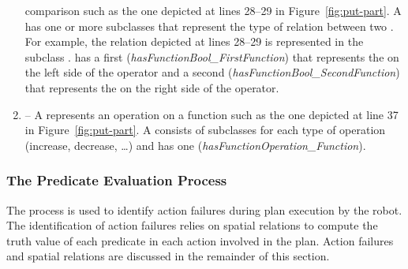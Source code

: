\begin{enumerate}
comparison such as the one depicted at lines 28--29 in Figure~\ref{fig:put-part}.
A  has one or more subclasses that represent the type of relation
between two . For example, the relation depicted at lines 28--29 is
represented in the subclass .  has a first
 (\emph{hasFunctionBool\_FirstFunction}) that represents the 
on the left side of the operator and a second  (\emph{hasFunctionBool\_SecondFunction})
that represents the  on the right side of the operator.
\item {} -- A  represents an operation
on a function such as the one depicted at line 37 in Figure~\ref{fig:put-part}.
A  consists of subclasses for each type of operation
(increase, decrease, \ldots) and  has one 
(\emph{hasFunctionOperation\_Function}).
\end{enumerate}


\subsubsection{The Predicate Evaluation Process}
The  process is used to identify action failures
during plan execution by the robot. The identification of action failures relies
on spatial relations to compute the truth value of each predicate in each action
involved in the plan. Action failures and spatial relations are discussed in the remainder of this section.


